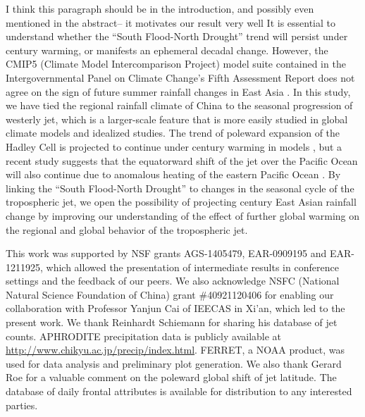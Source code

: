 \documentclass[draft,grl]{AGUTeX}
\begin{document}
\begin{article}
{\color{red} I think this paragraph should be in the introduction, and possibly even mentioned in the abstract-- it motivates our result very well} 
	It is essential to understand whether the ``South Flood-North Drought'' trend will persist under  century warming, or manifests an ephemeral decadal change. However, the CMIP5 (Climate Model Intercomparison Project) model suite contained in the Intergovernmental Panel on Climate Change's Fifth Assessment Report does not agree on the sign of future summer rainfall changes in East Asia \citep{Christensen2011}. In this study, we have tied the regional rainfall climate of China to the seasonal progression of westerly jet, which is a larger-scale feature that is more easily studied in global climate models and idealized studies. The trend of poleward expansion of the Hadley Cell is projected to continue under  century warming in models \citep{Lu2007,Kang2012}, but a recent study suggests that the equatorward shift of the jet over the Pacific Ocean will also continue due to anomalous heating of the eastern Pacific Ocean \citep{Park2014}. By linking the ``South Flood-North Drought'' to changes in the seasonal cycle of the tropospheric jet, we open the possibility of projecting  century East Asian rainfall change by improving our understanding of the effect of further global warming on the regional and global behavior of the tropospheric jet.



\begin{acknowledgments}
This work was supported by NSF grants AGS-1405479, EAR-0909195 and EAR-1211925, which allowed the presentation of intermediate results in conference settings and the feedback of our peers. We also acknowledge NSFC (National Natural Science Foundation of China) grant \#40921120406 for enabling our collaboration with Professor Yanjun Cai of IEECAS in Xi'an, which led to the present work. We thank Reinhardt Schiemann for sharing his database of jet counts. APHRODITE precipitation data is publicly available at \url{http://www.chikyu.ac.jp/precip/index.html}. FERRET, a NOAA product, was used for data analysis and preliminary plot generation. We also thank Gerard Roe for a valuable comment on the poleward global shift of jet latitude. The database of daily frontal attributes is available for distribution to any interested parties.
\end{acknowledgments}




%
%
\end{article}
%
%
%
%
%
\end{document}
